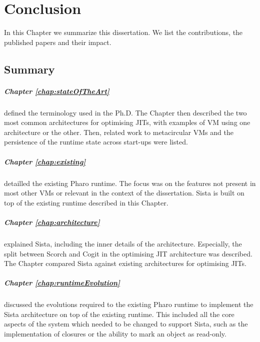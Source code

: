 \documentclass[a4paper,12pt,twoside]{../includes/ThesisStyle}
\begin{document}
\fi

\chapter{Conclusion}
\label{chap:conclusion}
\minitoc

In this Chapter we summarize this dissertation. We list the contributions, the published papers and their impact.

\section{Summary}

\paragraph{Chapter \ref{chap:stateOfTheArt}} defined the terminology used in the Ph.D. The Chapter then described the two most common architectures for optimising JITs, with examples of VM using one architecture or the other. Then, related work to metacircular VMs and the persistence of the runtime state across start-ups were listed.

\paragraph{Chapter \ref{chap:existing}} detailled the existing Pharo runtime. The focus was on the features not present in most other VMs or relevant in the context of the dissertation. Sista is built on top of the existing runtime described in this Chapter.

\paragraph{Chapter \ref{chap:architecture}} explained Sista, including the inner details of the architecture. Especially, the split between Scorch and Cogit in the optimising JIT architecture was described. The Chapter compared Sista against existing architectures for optimising JITs.

\paragraph{Chapter \ref{chap:runtimeEvolution}} discussed the evolutions required to the existing Pharo runtime to implement the Sista architecture on top of the existing runtime. This included all the core aspects of the system which needed to be changed to support Sista, such as the implementation of closures or the ability to mark an object as read-only.
\end{document}
